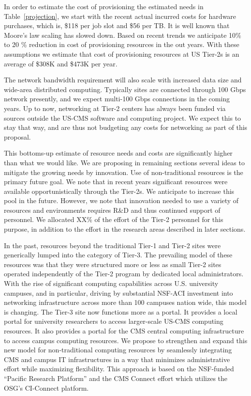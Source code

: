 \documentclass[11pt,a4paper]{article}
\begin{document}
In order to estimate the cost of provisioning the estimated needs in
Table~\ref{projection}, we start with the recent actual incurred costs 
for hardware purchases, which is, \$118 per job slot and \$56 per TB.
It is well known that Moore's law scaling has slowed down.  Based
on recent trends we anticipate 10\% to 20 \% reduction in cost of
provisioning resources in the out years.  With these assumptions
we estimate that cost of provisioning resources at US Tier-2s
is an average of \$308K and \$473K per year. 

The network bandwidth requirement will also scale with increased data
size and wide-area distributed computing.  Typically sites are
connected through 100 Gbps network presently, and we expect
multi-100 Gbps connections in the coming years. Up to now, networking at Tier-2 centers has always been funded
via sources outside the US-CMS software and computing project. We expect this to stay that way, and are thus not budgeting
any costs for networking as part of this proposal.

This bottoms-up estimate of resource needs and costs are significantly
higher than what we would like. We are proposing in remaining sections
several ideas to mitigate the growing needs by innovation.  Use of
non-traditional resources is the primary future goal.  We note that
in recent years significant resources were available opportunistically
through the Tier-2s.  We anticipate to increase this pool in the future.
However, we note that innovation needed to use a variety of resources
and environments requires R\&D and thus continued support of  personnel.
We allocated XX\% of the effort of the Tier-2 personnel for this
purpose, in addition to the effort in the research areas described
in later sections.


In the past, resources beyond the traditional Tier-1 and Tier-2 sites were generically lumped into the category of Tier-3.  The prevailing model of these resources was that they were structured more or less as small Tier-2 sites operated independently of the Tier-2 program by dedicated local administrators.  With the rise of significant computing capabilities across U.S. university campuses, and in particular, driving by substantial NSF-ACI investment into networking infrastructure across more than 100 campuses nation wide, this model is changing.  The Tier-3 site now functions more as a portal.  It provides a local portal for university researchers to access larger-scale US-CMS computing resources.  It also provides a portal for the CMS central computing infrastructure to access campus computing resources.  We propose to strengthen and expand this new model for non-traditional computing resources by seamlessly integrating CMS and campus IT infrastructures in a way that minimizes administrative effort while maximizing flexibility.  This approach is based on the NSF-funded ``Pacific Research Platform'' and the CMS Connect effort which utilizes the OSG's CI-Connect platform.
\end{document}
